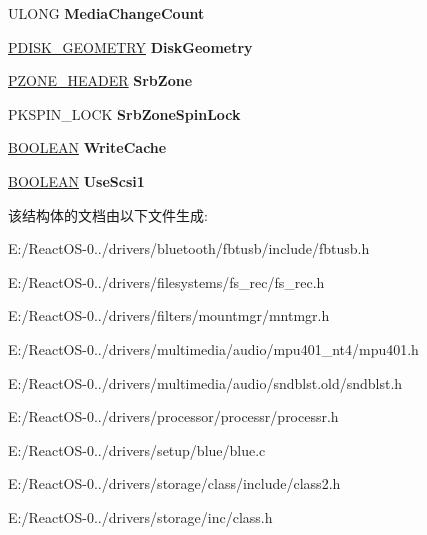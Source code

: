 \begin{DoxyCompactItemize}
\mbox{\label{struct___d_e_v_i_c_e___e_x_t_e_n_s_i_o_n_a458ac1c868894800c35fe390f52e7aa6}} 
U\+L\+O\+NG {\bfseries Media\+Change\+Count}
\item 
\mbox{\label{struct___d_e_v_i_c_e___e_x_t_e_n_s_i_o_n_a1973655e07dd03cb5686331ce23dbebe}} 
\hyperlink{struct___d_i_s_k___g_e_o_m_e_t_r_y}{P\+D\+I\+S\+K\+\_\+\+G\+E\+O\+M\+E\+T\+RY} {\bfseries Disk\+Geometry}
\item 
\mbox{\label{struct___d_e_v_i_c_e___e_x_t_e_n_s_i_o_n_afb32cb46ef7b99ba1294117beed3ca90}} 
\hyperlink{struct___z_o_n_e___h_e_a_d_e_r}{P\+Z\+O\+N\+E\+\_\+\+H\+E\+A\+D\+ER} {\bfseries Srb\+Zone}
\item 
\mbox{\label{struct___d_e_v_i_c_e___e_x_t_e_n_s_i_o_n_a25b9396fe8a034c552c25a8c9052b544}} 
P\+K\+S\+P\+I\+N\+\_\+\+L\+O\+CK {\bfseries Srb\+Zone\+Spin\+Lock}
\item 
\mbox{\label{struct___d_e_v_i_c_e___e_x_t_e_n_s_i_o_n_ada509b4d4510d2087d21751cd03f9639}} 
\hyperlink{_processor_bind_8h_a112e3146cb38b6ee95e64d85842e380a}{B\+O\+O\+L\+E\+AN} {\bfseries Write\+Cache}
\item 
\mbox{\label{struct___d_e_v_i_c_e___e_x_t_e_n_s_i_o_n_a76579416badb62819bb0b673e9ca1634}} 
\hyperlink{_processor_bind_8h_a112e3146cb38b6ee95e64d85842e380a}{B\+O\+O\+L\+E\+AN} {\bfseries Use\+Scsi1}
\end{DoxyCompactItemize}


该结构体的文档由以下文件生成\+:\begin{DoxyCompactItemize}
\item 
E\+:/\+React\+O\+S-\/0../drivers/bluetooth/fbtusb/include/fbtusb.\+h\item 
E\+:/\+React\+O\+S-\/0../drivers/filesystems/fs\+\_\+rec/fs\+\_\+rec.\+h\item 
E\+:/\+React\+O\+S-\/0../drivers/filters/mountmgr/mntmgr.\+h\item 
E\+:/\+React\+O\+S-\/0../drivers/multimedia/audio/mpu401\+\_\+nt4/mpu401.\+h\item 
E\+:/\+React\+O\+S-\/0../drivers/multimedia/audio/sndblst.\+old/sndblst.\+h\item 
E\+:/\+React\+O\+S-\/0../drivers/processor/processr/processr.\+h\item 
E\+:/\+React\+O\+S-\/0../drivers/setup/blue/blue.\+c\item 
E\+:/\+React\+O\+S-\/0../drivers/storage/class/include/class2.\+h\item 
E\+:/\+React\+O\+S-\/0../drivers/storage/inc/class.\+h\end{DoxyCompactItemize}
